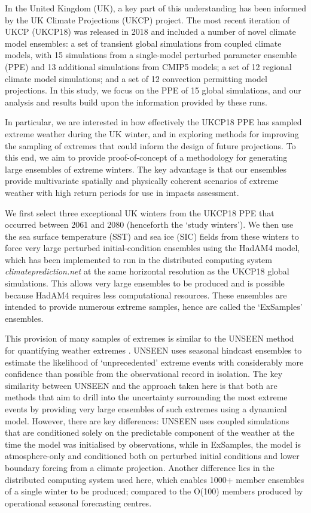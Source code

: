  In the United Kingdom (UK), a key part of this understanding has been informed by the UK Climate Projections (UKCP) project. The most recent iteration of UKCP (UKCP18) was released in 2018 \citep{lowe_ukcp18_2018,murphy_ukcp18_2018} and included a number of novel climate model ensembles: a set of transient global simulations from coupled climate models, with 15 simulations from a single-model perturbed parameter ensemble (PPE) and 13 additional simulations from CMIP5 models; a set of 12 regional climate model simulations; and a set of 12 convection permitting model projections. In this study, we focus on the PPE of 15 global simulations, and our analysis and results build upon the information provided by these runs.

  In particular, we are interested in how effectively the UKCP18 PPE has sampled extreme weather during the UK winter, and in exploring methods for improving the sampling of extremes that could inform the design of future projections. To this end, we aim to provide proof-of-concept of a methodology for generating large ensembles of extreme winters. The key advantage is that our ensembles provide multivariate spatially and physically coherent scenarios of extreme weather with high return periods for use in impacts assessment.

  We first select three exceptional UK winters from the UKCP18 PPE that occurred between 2061 and 2080 (henceforth the `study winters'). We then use the sea surface temperature (SST) and sea ice (SIC) fields from these winters to force very large perturbed initial-condition ensembles using the HadAM4 model, which has been implemented to run in the distributed computing system \emph{climateprediction.net} at the same horizontal resolution as the UKCP18 global simulations. This allows very large ensembles to be produced and is possible because HadAM4 requires less computational resources. These ensembles are intended to provide numerous extreme samples, hence are called the `ExSamples' ensembles.

  This provision of many samples of extremes is similar to the UNSEEN method for quantifying weather extremes \citep{kelder_using_2020,thompson_high_2017}. UNSEEN uses seasonal hindcast ensembles to estimate the likelihood of `unprecedented' extreme events with considerably more confidence than possible from the observational record in isolation. The key similarity between UNSEEN and the approach taken here is that both are methods that aim to drill into the uncertainty surrounding the most extreme events by providing very large ensembles of such extremes using a dynamical model. However, there are key differences: UNSEEN uses coupled simulations that are conditioned solely on the predictable component of the weather at the time the model was initialised by observations, while in ExSamples, the model is atmosphere-only and conditioned both on perturbed initial conditions and lower boundary forcing from a climate projection. Another difference lies in the distributed computing system used here, which enables 1000+ member ensembles of a single winter to be produced; compared to the O(100) members produced by operational seasonal forecasting centres.

